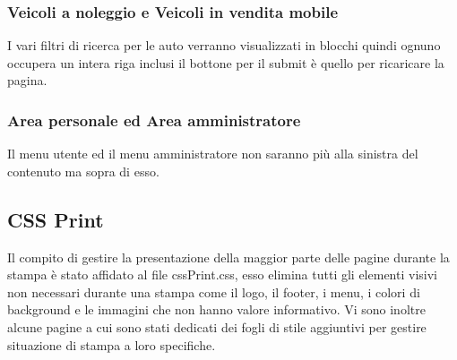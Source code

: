         \subsubsection{Veicoli a noleggio e Veicoli in vendita mobile}
        I vari filtri di ricerca per le auto verranno visualizzati in blocchi quindi ognuno occupera un intera riga inclusi il bottone per il submit è quello per ricaricare la pagina.

        \subsubsection{Area personale ed Area amministratore}
        Il menu utente ed il menu amministratore non saranno più alla sinistra del contenuto ma sopra di esso.
    
    \subsection{CSS Print}
        Il compito di gestire la presentazione della maggior parte delle pagine durante la stampa è stato affidato al file cssPrint.css, esso elimina tutti gli elementi visivi non necessari durante una stampa come il logo, il footer, i menu, i colori di background e le immagini che non hanno valore informativo.
        Vi sono inoltre alcune pagine a cui sono stati dedicati dei fogli di stile aggiuntivi per gestire situazione di stampa a loro specifiche.



\pagebreak
